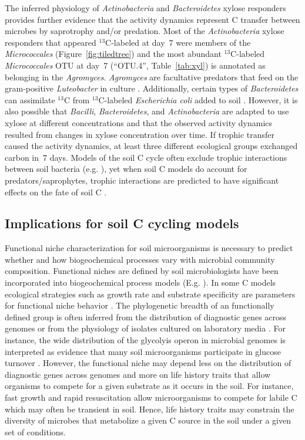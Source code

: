 The inferred physiology of \textit{Actinobacteria} and \textit{Bacteroidetes}
xylose responders provides further evidence that the activity dynamics
represent C transfer between microbes by saprotrophy and/or predation. Most of
the \textit{Actinobacteria} xylose responders that appeared $^{13}$C-labeled at
day~7 were members of the \textit{Micrococcales} (Figure~\ref{fig:tiledtree})
and the most abundant $^{13}$C-labeled \textit{Micrococcales} OTU at day~7
(“OTU.4”, Table~\ref{tab:xyl}) is annotated as belonging in the
\textit{Agromyces}. \textit{Agromyces} are facultative predators that feed on
the gram-positive \textit{Luteobacter} in culture \citep{16346402}.
Additionally, certain types of \textit{Bacteroidetes} can assimilate $^{13}$C
from $^{13}$C-labeled \textit{Escherichia coli} added to soil
\citep{Lueders2006}. However, it is also possible that \textit{Bacilli},
\textit{Bacteroidetes}, and \textit{Actinobacteria} are adapted to use xylose
at different concentrations and that the observed activity dynamics resulted
from changes in xylose concentration over time. If trophic transfer caused the
activity dynamics, at least three different ecological groups exchanged carbon
in~7 days. Models of the soil C cycle often exclude trophic interactions
between soil bacteria (e.g. \citep{Moore1988}), yet when soil C models do
account for predators/saprophytes, trophic interactions are predicted to have
significant effects on the fate of soil C \citep{Kaiser2014a}. 

\subsection{Implications for soil C cycling models}
Functional niche characterization for soil microorganisms is necessary to
predict whether and how biogeochemical processes vary with microbial community
composition. Functional niches are defined by soil microbiologists have been
incorporated into biogeochemical process models (E.g.
\citep{wieder_2014a,Kaiser2014a}). In some C models ecological strategies such
as growth rate and substrate specificity are parameters for functional niche
behavior \citep{Kaiser2014a}. The phylogenetic breadth of an functionally
defined group is often inferred from the distribution of diagnostic genes
across genomes \citep{Berlemont2013} or from the physiology of isolates
cultured on laboratory media \citep{Martiny2013}. For instance, the wide
distribution of the glycolyis operon in microbial genomes is interpreted as
evidence that many soil microorganisms participate in glucose turnover
\citep{McGuire2010}. However, the functional niche may depend less on the
distribution of diagnostic genes across genomes and more on life history
traits that allow organisms to compete for a given substrate as it occurs in
the soil. For instance, fast growth and rapid resuscitation allow
microorganisms to compete for labile C which may often be transient in soil.
Hence, life history traits may constrain the diversity of microbes that
metabolize a given C source in the soil under a given set of conditions.


